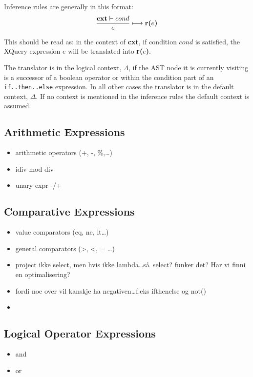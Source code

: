 Inference rules are generally in this format:
\begin{equation*}
\frac{\mbox{\textbf{cxt}}\vdash cond}{e}\longmapsto \mbox{\textbf{r(}}e\mbox{\textbf{)}}
\end{equation*}

This should be read as: in the context of \textbf{cxt}, if condition $cond$ is satisfied, the XQuery expression
$e$ will be translated into \textbf{r(}$e$\textbf{)}.

The translator is in the logical context, $\Lambda$, if the AST node it is currently visiting is a successor of a
boolean operator or within the condition part of an \texttt{if..then..else} expression. In all other cases the
translator is in the default context, $\Delta$. If no context is mentioned in the inference rules the default
context is assumed.





\subsection{Arithmetic Expressions}
\label{sect:trans:TD:atrith}
\begin{itemize}
  \item arithmetic operators (+, -, \%,\ldots)
  \item idiv mod div
  \item unary expr -/+
\end{itemize}

\subsection{Comparative Expressions}
\label{sect:trans:TD:compArit}
\begin{itemize}
  \item value comparators (eq, ne, lt\ldots)
  \item general comparators (>, <, = \ldots)
  \item project ikke select, men hvis ikke lambda\ldots s\aa~select? funker det? Har vi finni en optimalisering?
  \item fordi noe over vil kanskje ha negativen\ldots f.eks ifthenelse og not()  \item 
\end{itemize}

\subsection{Logical Operator Expressions}
\label{sect:trans:TD:logical}
\begin{itemize}
  \item and
  \item or
\end{itemize}

